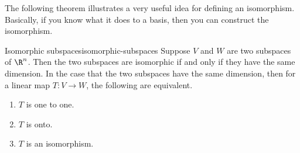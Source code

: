 The following theorem illustrates a very useful idea for defining an
isomorphism. Basically, if you know what it does to a basis, then you can
construct the isomorphism.

\begin{theorem}{Isomorphic subspaces}{isomorphic-subspaces}
Suppose $V$ and $W$ are two subspaces of $\R^n$. Then the two
subspaces are isomorphic if and only if they have the same dimension. In the
case that the two subspaces have the same dimension, then for
 a linear map $T:V\rightarrow W$, the
following are equivalent.

\begin{enumerate}
\item $T$ is one to one.

\item $T$ is onto.

\item $T$ is an isomorphism.
\end{enumerate}
\end{theorem}

